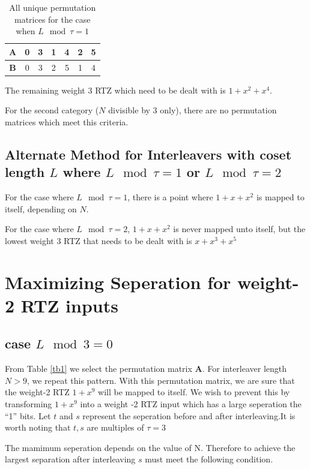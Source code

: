\documentclass[11pt, oneside, dvipdfmx]{book}
\begin{document}
 \begin{table}[h!]
\centering
\begin{tabular}{|c || c  c  c  c  c  c |} 
 \hline
 $\mathbf{A}$ & 0 & 3 & 1 & 4 & 2 & 5\\ 
  \hline
 $\mathbf{B}$ & 0 & 3 & 2 & 5 & 1 & 4\\ 
 \hline
\end{tabular}
\caption{All unique permutation matrices for the case when $L \mod \tau =1$}
\label{tb6}
\end{table}
 
 The remaining weight 3 RTZ which need to be dealt with is $1+x^2+x^4$. 
 
 
 For the second category ($N$ divisible by $3$ only), there are no permutation matrices which meet this criteria.
 
  \subsection{Alternate Method for Interleavers with coset length $L$ where $L \mod \tau =1$ or $L \mod \tau =2$}
  For the case where  $L \mod \tau =1$, there is a point where $1+x+x^2$ is mapped to itself, depending on $N$.
  
  For the case where  $L \mod \tau =2$, $1+x+x^2$ is never mapped unto itself, but the lowest weight $3$ RTZ that needs to be dealt with is $x+x^3+x^5$
  
  \section{Maximizing Seperation for weight-2 RTZ inputs}
  
 \subsection{case $L \mod 3 =0$}
  From Table \ref{tb1} we select the permutation matrix $\mathbf{A}$. For interleaver length $N>9$, we repeat this pattern. With this permutation matrix, we are sure that the weight-2 RTZ $1+x^9$ will be mapped to itself. We wish to prevent this by transforming $1+x^9$ into a weight -2 RTZ input which has a large seperation the ``1'' bits. Let $t$ and $s$ represent the seperation before and after interleaving.It is worth noting that $t,s$ are multiples of $\tau =3$
  
  The mamimum seperation depends on the value of N. Therefore to achieve the largest separation after interleaving $s$ must meet the following condition. 
  
\end{document}
